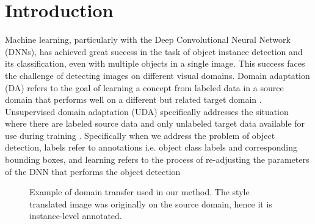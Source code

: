 \documentclass[10pt,twocolumn,letterpaper]{article}
\begin{document}

\section{Introduction}

Machine learning, particularly with the Deep Convolutional Neural Network (DNNs), has achieved great success in the task of object instance detection and its classification, even with multiple objects in a single image. This success faces the challenge of detecting images on different visual domains.   
Domain adaptation (DA) refers to the goal of learning a concept from labeled data in a source domain that performs well on a different but related target domain \cite{ganin2016domainadversarial, Goodfellow-et-al-2016, 5288526}. Unsupervised domain adaptation (UDA) specifically addresses the situation where there are labeled source data and only unlabeled target data available for use during training \cite{ganin2016domainadversarial, long2015learning}. Specifically when we address the problem of object detection, labels refer to annotations i.e. object class labels and corresponding bounding boxes, and learning refers to the process of re-adjusting the parameters of the DNN that performs the object detection 

\begin{figure}[t]
\begin{center}
\end{center}
   \caption{Example of domain transfer used in our method. The style translated image was originally on the source domain, hence it is instance-level annotated. }
\label{fig:long}
\label{fig:onecol}
\end{figure}
\end{document}
